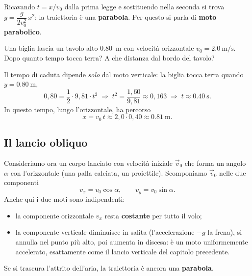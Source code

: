 Ricavando $t = x/v_0$ dalla prima legge e sostituendo nella seconda si trova $y = \dfrac{g}{2v_0^2}\,x^2$: la traiettoria è una \textbf{parabola}. Per questo si parla di \textbf{moto parabolico}.

\begin{testexample}
Una biglia lascia un tavolo alto \SI{0,80}{\metre} con velocità orizzontale $v_0 = \SI{2,0}{\metre\per\second}$. Dopo quanto tempo tocca terra? A che distanza dal bordo del tavolo?

Il tempo di caduta dipende \emph{solo} dal moto verticale: la biglia tocca terra quando $y = \SI{0,80}{\metre}$,
\[ 0,80 = \frac{1}{2}\cdot 9{,}81 \cdot t^2 \;\Longrightarrow\; t^2 = \frac{1,60}{9{,}81} \approx 0,163 \;\Longrightarrow\; t \approx \SI{0,40}{\second}. \]
In questo tempo, lungo l'orizzontale, ha percorso
\[ x = v_0\,t \approx 2{,}0 \cdot 0{,}40 \approx \SI{0,81}{\metre}. \]
\end{testexample}

\subsection{Il lancio obliquo}
Consideriamo ora un corpo lanciato con velocità iniziale $\vec v_0$ che forma un angolo $\alpha$ con l'orizzontale (una palla calciata, un proiettile). Scomponiamo $\vec v_0$ nelle due componenti
\[ v_x = v_0\cos\alpha, \qquad v_y = v_0\sin\alpha. \]
Anche qui i due moti sono indipendenti:
\begin{itemize}
    \item la componente orizzontale $v_x$ resta \textbf{costante} per tutto il volo;
    \item la componente verticale diminuisce in salita (l'accelerazione $-g$ la frena), si annulla nel punto più alto, poi aumenta in discesa: è un moto uniformemente accelerato, esattamente come il lancio verticale del capitolo precedente.
\end{itemize}
Se si trascura l'attrito dell'aria, la traiettoria è ancora una \textbf{parabola}.

